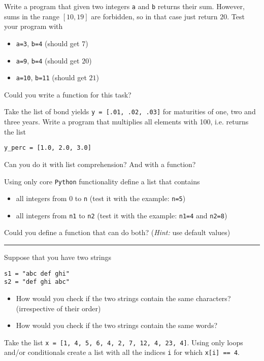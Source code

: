 \begin{questions}
\item Write a program that given two integers \texttt{a} and \texttt{b} returns their sum. However, sums in the range $[10, 19]$ are forbidden, so in that case just return $20$. Test your program with
\begin{itemize}
\item \texttt{a=3}, \texttt{b=4} (should get $7$)
\item \texttt{a=9}, \texttt{b=4} (should get $20$)
\item \texttt{a=10}, \texttt{b=11} (should get $21$)
\end{itemize}
Could you write a function for this task?

\item Take the list of bond yields \texttt{y = [.01, .02, .03]} for maturities of one, two and three years. Write a program that multiplies all elements with 100, i.e. returns the list
\begin{verbatim}
y_perc = [1.0, 2.0, 3.0]
\end{verbatim}
Can you do it with list comprehension? And with a function?


\item Using only core \texttt{Python} functionality define a list that contains
\begin{itemize}
\item all integers from 0 to \texttt{n} (test it with the example: \texttt{n=5})
\item all integers from \texttt{n1} to \texttt{n2} (test it with the example: \texttt{n1=4} and \texttt{n2=8})
\end{itemize}
Could you define a function that can do both? (\emph{Hint:} use default values)


\begin{center}
\noindent\rule{10cm}{0.4pt}
\end{center}

\item Suppose that you have two strings
\begin{verbatim}
s1 = "abc def ghi"
s2 = "def ghi abc"
\end{verbatim}
\begin{itemize}
\item How would you check if the two strings contain the same characters? (irrespective of their order)
\item How would you check if the two strings contain the same words?
\end{itemize}

\item Take the list \texttt{x = [1, 4, 5, 6, 4, 2, 7, 12, 4, 23, 4]}. Using only loops and/or conditionals create a list with all the indices \texttt{i} for which
\texttt{x[i] == 4}.



\end{questions}
%


